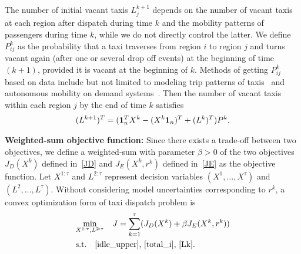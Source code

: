 \documentclass[10pt,twocolumn,twoside,english]{IEEEtran}
\begin{document}
The number of initial vacant taxis $L_j^{k+1}$ depends on the number of vacant taxis at each region after dispatch during time $k$ and the mobility patterns of passengers during time $k$, while we do not directly control the latter. We define $P^k_{ij}$ as the probability that a taxi traverses from region $i$ to region $j$ and turns vacant again (after one or several drop off events) at the beginning of time $(k+1)$, provided it is vacant at the beginning of $k$. Methods of getting $P^k_{ij}$ based on data include but not limited to modeling trip patterns of taxis~\cite{taxi_Feiiccps15} and autonomous mobility on demand systems~\cite{mod}. Then the number of vacant taxis within each region $j$ by the end of time $k$ satisfies
\begin{align}
\vspace{-8pt}
(L^{k+1})^T=( \mathbf{1}^T_n X^k -(X^k \mathbf{1}_n)^T+(L^k)^T )P^k.
\label{Lk}
\end{align}


\textbf{Weighted-sum objective function:} Since there exists a trade-off between two objectives, we define a weighted-sum with parameter $\beta > 0$ of the two objectives $J_D(X^k)$ defined in~\eqref{JD} and $J_E(X^k, r^k)$ defined in~\eqref{JE} as the objective function. Let $X^{1:\tau}$ and $L^{2:\tau}$ represent decision variables $(X^1, \dots,X^{\tau})$ and $(L^2,\dots, L^{\tau})$. Without considering model uncertainties corresponding to $r^k$, a convex optimization form of taxi dispatch problem is 
\begin{align}
\begin{split}
&\underset{X^{1:\tau}, L^{2:\tau}}{\text{min}}
 \quad J =\sum_{k=1}^{\tau} (J_D(X^k)+\beta J_E(X^k,r^k))\\
&\text{s.t.\ \     ~\eqref{idle_upper},~\eqref{total_i},~\eqref{Lk}}.
\end{split}
\label{nonr}
\end{align}
\end{document}
